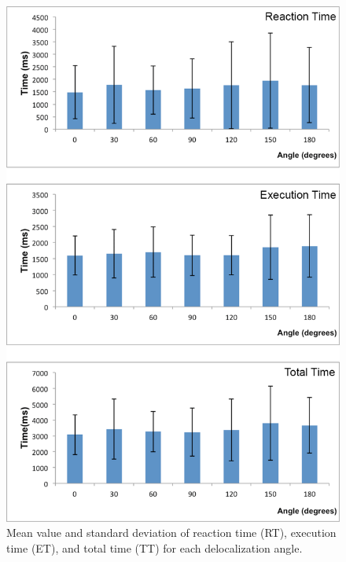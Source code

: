\begin{figure}[ht]
  \centering
  \includegraphics[width=\textwidth]{figures/2_angles}
  \caption{\label{fig:2_angles}Mean value and standard deviation of reaction time (RT), execution time (ET), and total time (TT) for each delocalization angle.}
\end{figure}

